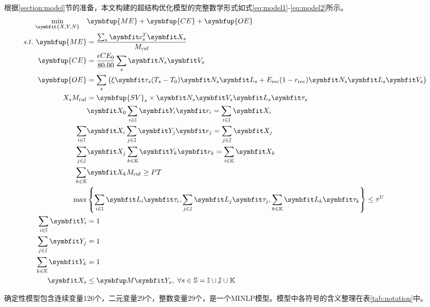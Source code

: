 根据\ref{section:model}节的准备，本文构建的超结构优化模型的完整数学形式如式\eqref{eq:model1}-\eqref{eq:model2}所示。
\begin{align}
  \min_{\symbfit{X,Y,N}}\quad & \symbfup{ME} + \symbfup{CE} + \symbfup{OE} \label{eq:model1} \\
  s.t.\ \symbfup{ME} &= \frac{\sum_{s}\symbfit c_s^T\symbfit X_s}{M_{\rm ruf}} \\
   \symbfup{CE} &= \frac{\epsilon CE_0}{80.00}\sum_{s}\symbfit N_s\symbfit V_s \\
   \symbfup{OE} &= \sum_s \big(\xi\symbfit\tau_s(T_s-T_0)\symbfit N_s\symbfit L_s +E_{\rm rec}(1-r_{\rm rec})\symbfit N_s\symbfit L_s\symbfit V_s\big) \\
   X_sM_{\rm ruf} &= \symbfup{SV}_s\times\symbfit N_s\symbfit V_s\symbfit L_s\symbfit\tau_{s} \\
   &\symbfit X_0\sum_{i\in\mathbb I}\symbfit Y_i\symbfit r_i=\sum_{i\in\mathbb I}\symbfit X_i \\
  \sum_{i\in\mathbb I}&\symbfit X_i\sum_{j\in\mathbb J}\symbfit Y_j\symbfit r_j=\sum_{j\in\mathbb J}\symbfit X_j \\
  \sum_{j\in\mathbb J}&\symbfit X_j\sum_{k\in\mathbb K}\symbfit Y_k\symbfit r_k=\sum_{i\in\mathbb K}\symbfit X_k \\
  \sum_{k\in\mathbb K}&\symbfit X_kM_{\rm ruf}\ge PT \\
  \max&\left\{\sum_{i\in\mathbb I}\symbfit L_i\symbfit\tau_i,\sum_{j\in\mathbb J}\symbfit L_j\symbfit\tau_j,\sum_{k\in\mathbb K}\symbfit L_k\symbfit\tau_k\right\} \le \tau^U \\
  \sum_{i\in\mathbb I}\symbfit Y_i&=1  \\
  \sum_{j\in\mathbb J}\symbfit Y_j&=1 \\ 
  \sum_{k\in\mathbb K}\symbfit Y_k&=1 \\
  \symbfit X_s &\le \symbfup M\symbfit Y_s,\ \forall s\in \mathbb S = \mathbb I \cup\mathbb J\cup\mathbb K \label{eq:model2}
\end{align}

确定性模型包含连续变量126个，二元变量29个，整数变量29个，是一个MINLP模型。模型中各符号的含义整理在表\ref{tab:notation}中。

